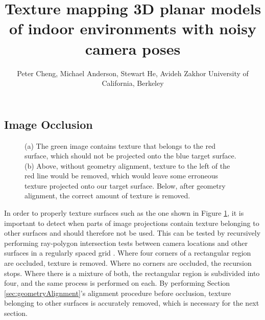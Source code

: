 \documentclass[]{spie}  %
\title{Texture mapping 3D planar models of indoor environments with noisy camera poses}
\author{Peter Cheng, Michael Anderson, Stewart He, Avideh Zakhor
\skiplinehalf
University of California, Berkeley\\
}
\begin{document}
\subsection{Image Occlusion}
\label{sec:imageOcclusion}

\begin{figure}
  \centering
  \hspace{0.4cm} 
  \caption{(a) The green image contains texture that belongs to the red surface, which should not be projected onto the blue target surface. (b) Above, without geometry alignment, texture to the left of the red line would be removed, which would leave some erroneous texture projected onto our target surface. Below, after geometry alignment, the correct amount of texture is removed.}
  \label{fig:occlusion}
\end{figure}

In order to properly texture surfaces such as the one shown in Figure
\ref{fig:occlusion}, it is important to detect when parts of image
projections contain texture belonging to other surfaces and should
therefore not be used. This can be tested by recursively performing
ray-polygon intersection tests between camera locations and other
surfaces in a regularly spaced grid \cite{rayintersection}. Where four
corners of a rectangular region are occluded, texture is
removed. Where no corners are occluded, the recursion stops. Where
there is a mixture of both, the rectangular region is subdivided into
four, and the same process is performed on each. By performing Section
\ref{sec:geometryAlignment}'s alignment procedure before occlusion,
texture belonging to other surfaces is accurately removed, which is
necessary for the next section.

\end{document}
